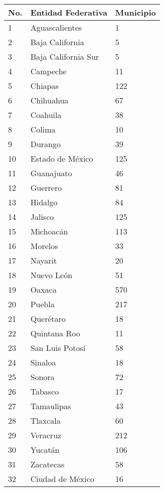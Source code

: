 \documentclass[12pt]{article}
\begin{document}
	\begin{table}[H]
        \begin{tabular}{|p{4cm}|p{8cm}|p{4cm}|}
        \hline
            \textbf{No.}	& \textbf{Entidad Federativa}& 	\textbf{Municipio} \\ \hline
            	1 			&	Aguascalientes 			&			1			\\ \hline
                2			&	Baja California 		& 			5 			\\ \hline
            	3			&	Baja California Sur  	&			5 			\\ \hline
            	4			&	Campeche				&			11 			\\ \hline
            	5			&	Chiapas					&			122			\\ \hline
            	6			&	Chihuahua				&			67			\\ \hline
            	7			&	Coahuila 				&			38			\\ \hline
            	8			&	Colima					&			10			\\ \hline
            	9			&	Durango					&			39			\\ \hline
            	10			&	Estado de México		&			125			\\ \hline
            	11			&	Guanajuato				&			46			\\ \hline
            	12			&	Guerrero				&			81			\\ \hline
            	13			&	Hidalgo					&			84			\\ \hline
            	14			&	Jalisco					&			125			\\ \hline
            	15			&	Michoacán				&			113			\\ \hline
            	16			&	Morelos					&			33			\\ \hline
            	17			&	Nayarit					&			20			\\ \hline
            	18			&	Nuevo León				&			51			\\ \hline
            	19			&	Oaxaca					&			570			\\ \hline
            	20			&	Puebla					&			217			\\ \hline
            	21			&	Querétaro				&			18			\\ \hline
            	22			&	Quintana Roo			&			11			\\ \hline
            	23			&	San Luis Potosí			&			58			\\ \hline
            	24			&	Sinaloa					&			18			\\ \hline
            	25			&	Sonora					&			72			\\ \hline
            	26			&	Tabasco					&			17			\\ \hline
            	27			&	Tamaulipas				&			43			\\ \hline
            	28			&	Tlaxcala				&			60			\\ \hline
            	29			&	Veracruz				&			212			\\ \hline
            	30			&	Yucatán					&			106			\\ \hline
            	31			&	Zacatecas				&			58			\\ \hline
            	32			&	Ciudad de México		&			16			\\ \hline
        \end{tabular}
    \end{table}
\end{document}
